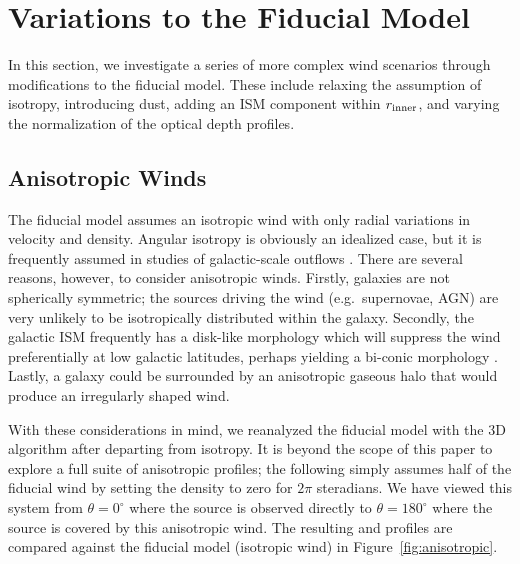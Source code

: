 \documentclass[12pt,preprint]{aastex}
\begin{document}
\section{Variations to the Fiducial Model}
\label{sec:variants}

In this section, we investigate a series of more complex wind
scenarios
through modifications to the fiducial model.  These include relaxing
the assumption of isotropy, introducing dust, adding an ISM
component within $r_{\rm inner}$, and varying the normalization of the
optical depth profiles.

\subsection{Anisotropic Winds}
\label{sec:anisotropic}

The fiducial model assumes an
isotropic wind with only radial variations in velocity and density. 
Angular isotropy is obviously an idealized case, but
it is frequently assumed in studies of galactic-scale outflows
\citep[e.g.][]{steidel+10}.   There are several reasons, however, to
consider anisotropic winds.  Firstly, galaxies are not spherically
symmetric;  the sources driving the
wind (e.g.\ supernovae, AGN) are very unlikely to be isotropically distributed
within the galaxy.  
Secondly, the galactic ISM frequently has a disk-like morphology
which will suppress the wind preferentially at low galactic latitudes,
perhaps yielding a bi-conic morphology \citep[e.g.][]{M87}.
Lastly, a galaxy could be surrounded by an
anisotropic gaseous halo that would produce an irregularly shaped
wind.

With these considerations in mind, we reanalyzed the fiducial model
with the 3D algorithm after departing from isotropy.  It is beyond the
scope of this paper to explore a full suite of anisotropic profiles;
the following simply assumes half of the fiducial wind by setting
the density to zero for $2\pi$ steradians.
We have viewed this system from $\theta = 0^\circ$ where
the source is observed directly to $\theta = 180^\circ$ where the source
is covered by this anisotropic wind.  The resulting  and
 profiles are compared against the fiducial model
(isotropic wind) in Figure~\ref{fig:anisotropic}.  
\end{document}
